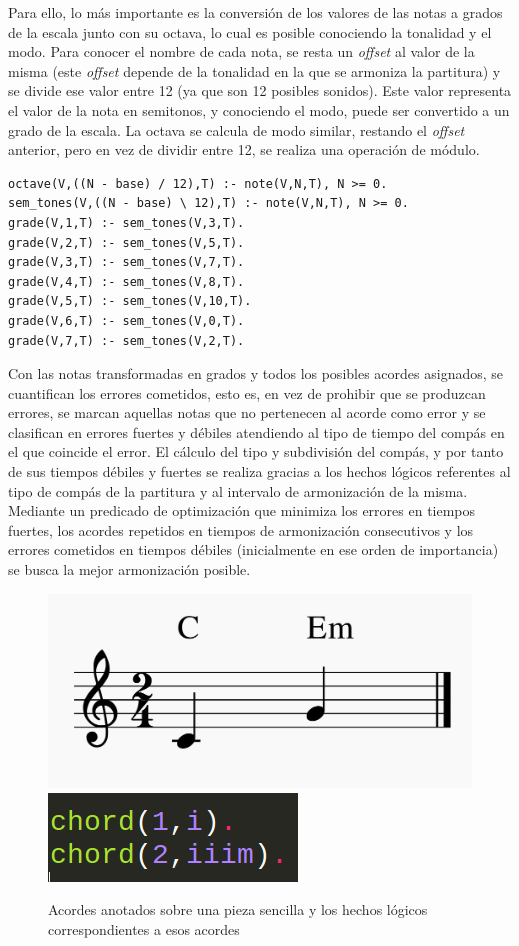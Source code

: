Para ello, lo más importante es la conversión de los valores de las notas a grados de la escala junto con su octava, lo cual es posible conociendo la tonalidad y el modo. Para conocer el nombre de cada nota, se resta un \textit{offset} al valor de la misma (este \textit{offset} depende de la tonalidad en la que se armoniza la partitura) y se divide ese valor entre 12 (ya que son 12 posibles sonidos). Este valor representa el valor de la nota en semitonos, y conociendo el modo, puede ser convertido a un grado de la escala.
La octava se calcula de modo similar, restando el \textit{offset} anterior, pero en vez de dividir entre 12, se realiza una operación de módulo.
\begin{Verbatim}[frame=single]
octave(V,((N - base) / 12),T) :- note(V,N,T), N >= 0.
sem_tones(V,((N - base) \ 12),T) :- note(V,N,T), N >= 0.
grade(V,1,T) :- sem_tones(V,3,T).
grade(V,2,T) :- sem_tones(V,5,T).
grade(V,3,T) :- sem_tones(V,7,T).
grade(V,4,T) :- sem_tones(V,8,T).
grade(V,5,T) :- sem_tones(V,10,T).
grade(V,6,T) :- sem_tones(V,0,T).
grade(V,7,T) :- sem_tones(V,2,T).
\end{Verbatim}
Con las notas transformadas en grados y todos los posibles acordes asignados, se cuantifican los errores cometidos, esto es, en vez de prohibir que se produzcan errores, se marcan aquellas notas que no pertenecen al acorde como error y se clasifican en errores fuertes y débiles atendiendo al tipo de tiempo del compás en el que coincide el error. El cálculo del tipo y subdivisión del compás, y por tanto de sus tiempos débiles y fuertes se realiza gracias a los hechos lógicos referentes al tipo de compás de la partitura y al intervalo de armonización de la misma.
Mediante un predicado de optimización que minimiza los errores en tiempos fuertes, los acordes repetidos en tiempos de armonización consecutivos y los errores cometidos en tiempos débiles (inicialmente en ese orden de importancia) se busca la mejor armonización posible.

\begin{figure}[h]
	\centering
	\includegraphics[width=0.4\linewidth,valign=c]{imagenes/harmonized_example.png}
	\includegraphics[width=0.2\linewidth,valign=c]{imagenes/chord_facts.png}
	\caption{Acordes anotados sobre una pieza sencilla y los hechos lógicos correspondientes a esos acordes}
	\label{fig:simple-piece-chords}
\end{figure}

